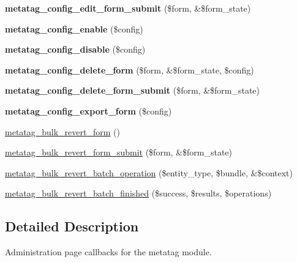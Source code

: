 \begin{DoxyCompactItemize}
\item 
\hypertarget{metatag_8admin_8inc_a0ecc81ff7c9547dd8c1ca7e2ec3325ac}{
{\bfseries metatag\_\-config\_\-edit\_\-form\_\-submit} (\$form, \&\$form\_\-state)}
\label{metatag_8admin_8inc_a0ecc81ff7c9547dd8c1ca7e2ec3325ac}

\item 
\hypertarget{metatag_8admin_8inc_a3d179de4ff83c2bbc898b8e3d6274f52}{
{\bfseries metatag\_\-config\_\-enable} (\$config)}
\label{metatag_8admin_8inc_a3d179de4ff83c2bbc898b8e3d6274f52}

\item 
\hypertarget{metatag_8admin_8inc_ad9363e69170b26a3644f4fe9604fb067}{
{\bfseries metatag\_\-config\_\-disable} (\$config)}
\label{metatag_8admin_8inc_ad9363e69170b26a3644f4fe9604fb067}

\item 
\hypertarget{metatag_8admin_8inc_a6c9a2da0a79fc88f9f525ee9051a4f40}{
{\bfseries metatag\_\-config\_\-delete\_\-form} (\$form, \&\$form\_\-state, \$config)}
\label{metatag_8admin_8inc_a6c9a2da0a79fc88f9f525ee9051a4f40}

\item 
\hypertarget{metatag_8admin_8inc_aaebba5a37610335c6107c3db4e5fdcfc}{
{\bfseries metatag\_\-config\_\-delete\_\-form\_\-submit} (\$form, \&\$form\_\-state)}
\label{metatag_8admin_8inc_aaebba5a37610335c6107c3db4e5fdcfc}

\item 
\hypertarget{metatag_8admin_8inc_a87a318e3837f3737d0326d6ccbd1c156}{
{\bfseries metatag\_\-config\_\-export\_\-form} (\$config)}
\label{metatag_8admin_8inc_a87a318e3837f3737d0326d6ccbd1c156}

\item 
\hyperlink{metatag_8admin_8inc_a73f02a09e1068de6e28ae97baa10a041}{metatag\_\-bulk\_\-revert\_\-form} ()
\item 
\hyperlink{metatag_8admin_8inc_a175595665a6d1fead2df7b214a3845d8}{metatag\_\-bulk\_\-revert\_\-form\_\-submit} (\$form, \&\$form\_\-state)
\item 
\hyperlink{metatag_8admin_8inc_a390b69e3ff58bff4a023797722f91314}{metatag\_\-bulk\_\-revert\_\-batch\_\-operation} (\$entity\_\-type, \$bundle, \&\$context)
\item 
\hyperlink{metatag_8admin_8inc_a3fae24225b7ba1a63a6317b49c147094}{metatag\_\-bulk\_\-revert\_\-batch\_\-finished} (\$success, \$results, \$operations)
\end{DoxyCompactItemize}


\subsection{Detailed Description}
Administration page callbacks for the metatag module. 

